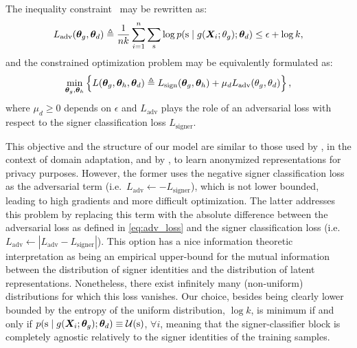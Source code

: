 The inequality constraint~ may be rewritten as:
\begin{equation}
\label{eq:adv_loss}
L_{\text{adv}}({\bm{\theta}}_g, {\bm{\theta}}_d) \triangleq \frac{1}{nk}\sum_{i=1}^n \sum_{{\textnormal{s}}} \log p({\textnormal{s}} \mid g({\bm{X}}_{i}; \theta_g); {\bm{\theta}}_d) \leq \epsilon + \log k,
\end{equation}
and the constrained optimization problem may be equivalently formulated as:
\begin{equation}
\label{eq:tr_obj}
\min_{{\bm{\theta}}_g, {\bm{\theta}}_h}  \left\lbrace L({\bm{\theta}}_g, {\bm{\theta}}_h, {\bm{\theta}}_d) \triangleq L_{\text{sign}}({\bm{\theta}}_g, {\bm{\theta}}_h) + \mu_d L_{\text{adv}}(\theta_g, \theta_d) \right\rbrace,
\end{equation}
where $\mu_d \geq 0$ depends on $\epsilon$ and $L_{\text{adv}}$ plays the role of an adversarial loss with respect to the signer classification loss $L_{\text{signer}}$.

This objective and the structure of our model are similar to those used by \citet{Ganin2015}, in the context of domain adaptation, and by \citet{Feutry2018}, to learn anonymized representations for privacy purposes. However, the former uses the negative signer classification loss as the adversarial term (i.e.\ $L_{\text{adv}} \leftarrow -L_{\text{signer}}$), which is not lower bounded, leading to high gradients and more difficult optimization. The latter addresses this problem by replacing this term with the absolute difference between the adversarial loss as defined in \eqref{eq:adv_loss} and the signer classification loss (i.e.\ $L_{\text{adv}} \leftarrow |L_{\text{adv}} - L_{\text{signer}}|$). This option has a nice information theoretic interpretation as being an empirical upper-bound for the mutual information between the distribution of signer identities and the distribution of latent representations. Nonetheless, there exist infinitely many (non-uniform) distributions for which this loss vanishes. Our choice, besides being clearly lower bounded by the entropy of the uniform distribution, $\log k$, is minimum if and only if $p({\textnormal{s}} \mid g({\bm{X}}_{i}; {\bm{\theta}}_g); {\bm{\theta}}_d) \equiv {\mathcal{U}}({\textnormal{s}})$, $\forall i$, meaning that the signer-classifier block is completely agnostic relatively to the signer identities of the training samples.

